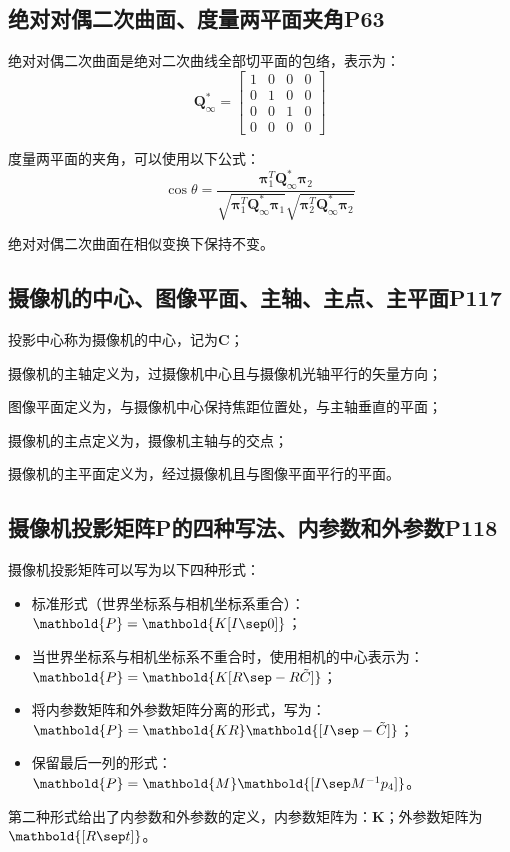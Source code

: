 \documentclass[11pt]{article}
\begin{document}
\subsection{绝对对偶二次曲面、度量两平面夹角P63}
绝对对偶二次曲面是绝对二次曲线全部切平面的包络，表示为：
\begin{equation*}
  \mathbold{Q}^*_\infty=\begin{bmatrix}
    1 & 0 & 0 & 0 \\
    0 & 1 & 0 & 0 \\
    0 & 0 & 1 & 0 \\
    0 & 0 & 0 & 0
  \end{bmatrix}
\end{equation*}\par
度量两平面的夹角，可以使用以下公式：
\begin{equation*}
  \cos\theta=\frac{\mathbold{\pi}_1^T\mathbold{Q}^*_\infty\mathbold{\pi}_2}{\sqrt{\mathbold{\pi}_1^T\mathbold{Q}^*_\infty\mathbold{\pi}_1}\sqrt{\mathbold{\pi}_2^T\mathbold{Q}^*_\infty\mathbold{\pi}_2}}
\end{equation*}\par
绝对对偶二次曲面在相似变换下保持不变。
\subsection{摄像机的中心、图像平面、主轴、主点、主平面P117}
投影中心称为摄像机的中心，记为$\mathbold{C}$；\par
摄像机的主轴定义为，过摄像机中心且与摄像机光轴平行的矢量方向；\par
图像平面定义为，与摄像机中心保持焦距位置处，与主轴垂直的平面；\par
摄像机的主点定义为，摄像机主轴与的交点；\par
摄像机的主平面定义为，经过摄像机且与图像平面平行的平面。\par
\subsection{摄像机投影矩阵P的四种写法、内参数和外参数P118}
摄像机投影矩阵可以写为以下四种形式：
\begin{itemize}
  \item 标准形式（世界坐标系与相机坐标系重合）：$\mathbold{P}=\mathbold{K[I\sep 0]}$；
  \item 当世界坐标系与相机坐标系不重合时，使用相机的中心表示为：$\mathbold{P}=\mathbold{K[R\sep -R\tilde{C}]}$；
  \item 将内参数矩阵和外参数矩阵分离的形式，写为：$\mathbold{P}=\mathbold{KR}\mathbold{[I\sep -\tilde{C}]}$；
  \item 保留最后一列的形式：$\mathbold{P}=\mathbold{M}\mathbold{[I\sep M^{-1}p_4]}$。
\end{itemize}\par
第二种形式给出了内参数和外参数的定义，内参数矩阵为：$\mathbold{K}$；外参数矩阵为$\mathbold{[R\sep t]}$。
\end{document}
